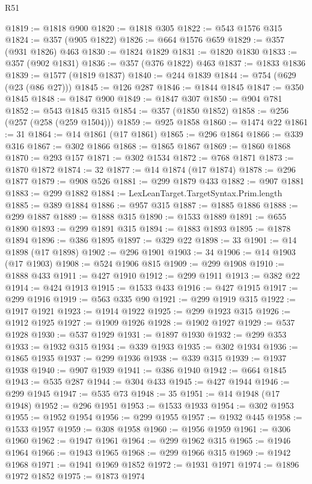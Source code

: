 \begin{lexlean}{R51}
\begin{coremodule}
@1819 := @1818 @900
@1820 := @1818 @305
@1822 := @543 @1576 @315
@1824 := @357 (@905 @1822)
@1826 := @664 @1576 @659
@1829 := @357 (@931 @1826) @463
@1830 := @1824 @1829
@1831 := @1820 @1830
@1833 := @357 (@902 @1831)
@1836 := @357 (@376 @1822) @463
@1837 := @1833 @1836
@1839 := @1577 (@1819 @1837)
@1840 := @244 @1839
@1844 := @754 (@629 (@23 (@86 @27)))
@1845 := @126 @287
@1846 := @1844 @1845
@1847 := @350 @1845
@1848 := @1847 @900
@1849 := @1847 @307
@1850 := @904 @781
@1852 := @543 @1845 @315
@1854 := @357 (@1850 @1852)
@1858 := @256 (@257 (@258 (@259 @1504)))
@1859 := @925 @1858
@1860 := @1474 @22
@1861 := 31
@1864 := @14 @1861 (@17 @1861)
@1865 := @296 @1864
@1866 := @339 @316
@1867 := @302 @1866
@1868 := @1865 @1867
@1869 := @1860 @1868
@1870 := @293 @157
@1871 := @302 @1534
@1872 := @768 @1871
@1873 := @1870 @1872
@1874 := 32
@1877 := @14 @1874 (@17 @1874)
@1878 := @296 @1877
@1879 := @908 @526
@1881 := @299 @1879 @433
@1882 := @907 @1881
@1883 := @299 @1882
@1884 := LexLeanTarget.TargetSyntax.Prim.length
@1885 := @389 @1884
@1886 := @957 @315
@1887 := @1885 @1886
@1888 := @299 @1887
@1889 := @1888 @315
@1890 := @1533 @1889
@1891 := @655 @1890
@1893 := @299 @1891 @315
@1894 := @1883 @1893
@1895 := @1878 @1894
@1896 := @386 @1895
@1897 := @329 @22
@1898 := 33
@1901 := @14 @1898 (@17 @1898)
@1902 := @296 @1901
@1903 := 34
@1906 := @14 @1903 (@17 @1903)
@1908 := @524 @1906 @815
@1909 := @299 @1908
@1910 := @1888 @433
@1911 := @427 @1910
@1912 := @299 @1911
@1913 := @382 @22
@1914 := @424 @1913
@1915 := @1533 @433
@1916 := @427 @1915
@1917 := @299 @1916
@1919 := @563 @335 @90
@1921 := @299 @1919 @315
@1922 := @1917 @1921
@1923 := @1914 @1922
@1925 := @299 @1923 @315
@1926 := @1912 @1925
@1927 := @1909 @1926
@1928 := @1902 @1927
@1929 := @537 @1928
@1930 := @537 @1929
@1931 := @1897 @1930
@1932 := @299 @353
@1933 := @1932 @315
@1934 := @339 @1933
@1935 := @302 @1934
@1936 := @1865 @1935
@1937 := @299 @1936
@1938 := @339 @315
@1939 := @1937 @1938
@1940 := @907 @1939
@1941 := @386 @1940
@1942 := @664 @1845
@1943 := @535 @287
@1944 := @304 @433
@1945 := @427 @1944
@1946 := @299 @1945
@1947 := @535 @73
@1948 := 35
@1951 := @14 @1948 (@17 @1948)
@1952 := @296 @1951
@1953 := @1533 @1933
@1954 := @302 @1953
@1955 := @1952 @1954
@1956 := @299 @1955
@1957 := @1932 @445
@1958 := @1533 @1957
@1959 := @308 @1958
@1960 := @1956 @1959
@1961 := @306 @1960
@1962 := @1947 @1961
@1964 := @299 @1962 @315
@1965 := @1946 @1964
@1966 := @1943 @1965
@1968 := @299 @1966 @315
@1969 := @1942 @1968
@1971 := @1941 @1969 @1852
@1972 := @1931 @1971
@1974 := @1896 @1972 @1852
@1975 := @1873 @1974

\end{coremodule}
\end{lexlean}
